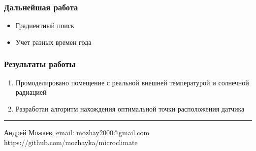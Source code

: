 \documentclass[14pt,aspectratio=169,hyperref={pdftex,unicode},xcolor=dvipsnames]{beamer}
\begin{document}
\begin{frame}
\frametitle{Дальнейшая работа}

\begin{itemize}
\item Градиентный поиск
\item Учет разных времен года 
\end{itemize}

\end{frame}



\begin{frame}
\frametitle{Результаты работы}

\begin{enumerate}
\item Промоделировано помещение с реальной внешней температурой и солнечной радиацией
\item Разработан алгоритм нахождения оптимальной точки расположения датчика
\end{enumerate}

\vspace{5mm}\hrule\vspace{5mm}

\begin{center}
Андрей Можаев, email: mozhay2000@gmail.com\\
https://github.com/mozhayka/microclimate
\end{center}

\end{frame}
\end{document}
